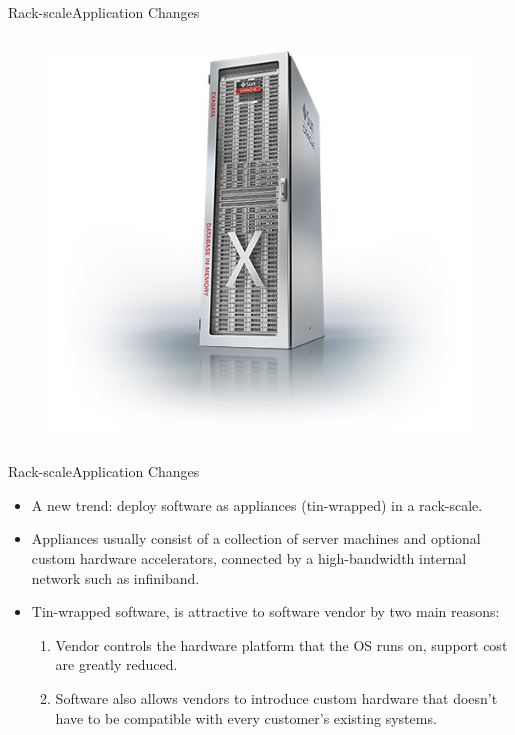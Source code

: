 \documentclass[10pt]{beamer}
\begin{document}
\begin{frame}{Rack-scale}{Application Changes}
\begin{columns}[T]
    \hfill
    \begin{column}{.5\textwidth}
      \begin{figure}[ht]
        \centering
        \includegraphics[width=1.3\textwidth, keepaspectratio=true]{images/exadata.jpg}
      \end{figure}
   \end{column}
  \end{columns}
\end{frame}

\begin{frame}{Rack-scale}{Application Changes}
  \begin{itemize}
    \item A new trend: deploy software as appliances (tin-wrapped) in a
          rack-scale. \pause
    \item Appliances usually consist of a collection of server machines and
          optional custom hardware accelerators, connected by a high-bandwidth
          internal network such as infiniband. \pause
    \item Tin-wrapped software, is attractive to software vendor by two main
          reasons: \pause
      \begin{enumerate}
        \item Vendor controls the hardware platform that the OS runs on,
               support cost are greatly reduced.
        \item Software also allows vendors to introduce custom hardware that
              doesn't have to be compatible with every customer's existing
              systems.
      \end{enumerate}
  \end{itemize}
\end{frame}
\end{document}
